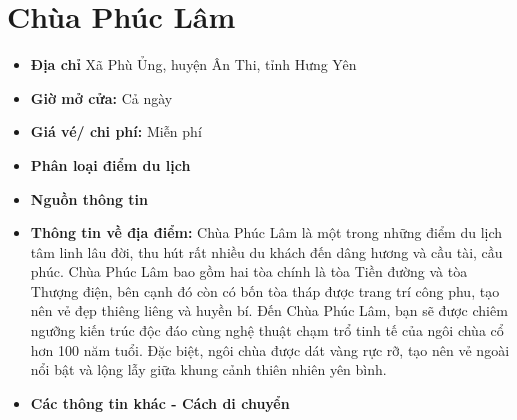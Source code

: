 \documentclass{article}
\begin{document}
\section{Chùa Phúc Lâm}
\begin{itemize}
    \item{\textbf{Địa chỉ}} Xã Phù Ủng, huyện Ân Thi, tỉnh Hưng Yên

    \item{\textbf{Giờ mở cửa:}} Cả ngày

    \item{\textbf{Giá vé/ chi phí:}} Miễn phí

    \item{\textbf{Phân loại điểm du lịch}} 

    \item{\textbf{Nguồn thông tin}} 

    \item{\textbf{Thông tin về địa điểm:}} Chùa Phúc Lâm là một trong những điểm du lịch tâm linh lâu đời, thu hút rất nhiều du khách đến dâng hương và cầu tài, cầu phúc. Chùa Phúc Lâm bao gồm hai tòa chính là tòa Tiền đường và tòa Thượng điện, bên cạnh đó còn có bốn tòa tháp được trang trí công phu, tạo nên vẻ đẹp thiêng liêng và huyền bí. Đến Chùa Phúc Lâm, bạn sẽ được chiêm ngưỡng kiến trúc độc đáo cùng nghệ thuật chạm trổ tinh tế của ngôi chùa cổ hơn 100 năm tuổi. Đặc biệt, ngôi chùa được dát vàng rực rỡ, tạo nên vẻ ngoài nổi bật và lộng lẫy giữa khung cảnh thiên nhiên yên bình.
\end{itemize}

\begin{itemize}
    \item{\textbf{Các thông tin khác - Cách di chuyển}} 
\end{itemize}
\end{document}
